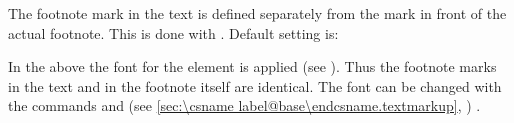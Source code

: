 %
The footnote mark in the text is defined separately from the mark in
front of the actual footnote. This is done with
. Default setting is:
\begin{lstcode}[belowskip=\dp\strutbox]
\end{lstcode}
In the above the font
for the element
 is
applied (see %
%
%
). %
Thus the footnote
marks in the text and in the footnote itself are identical. The font
can be changed with the commands  and
 (see \autoref{sec:\csname
  label@base\endcsname.textmarkup}, )%
.

